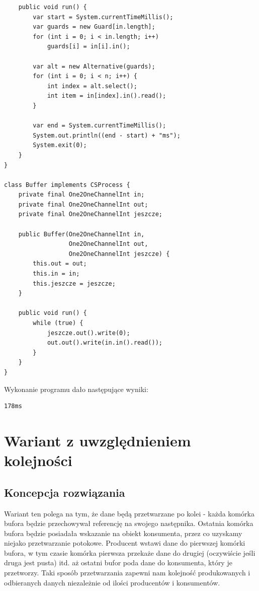 \documentclass[12pt]{article}
\begin{document}
\begin{verbatim}
    public void run() {
        var start = System.currentTimeMillis();
        var guards = new Guard[in.length];
        for (int i = 0; i < in.length; i++)
            guards[i] = in[i].in();

        var alt = new Alternative(guards);
        for (int i = 0; i < n; i++) {
            int index = alt.select();
            int item = in[index].in().read();
        }

        var end = System.currentTimeMillis();
        System.out.println((end - start) + "ms");
        System.exit(0);
    }
}

class Buffer implements CSProcess {
    private final One2OneChannelInt in;
    private final One2OneChannelInt out;
    private final One2OneChannelInt jeszcze;

    public Buffer(One2OneChannelInt in,
                  One2OneChannelInt out,
                  One2OneChannelInt jeszcze) {
        this.out = out;
        this.in = in;
        this.jeszcze = jeszcze;
    }

    public void run() {
        while (true) {
            jeszcze.out().write(0);
            out.out().write(in.in().read());
        }
    }
}
\end{verbatim}
\noindent
Wykonanie programu dało następujące wyniki:
\begin{verbatim}
178ms
\end{verbatim}

\section{Wariant z uwzględnieniem kolejności}
\subsection{Koncepcja rozwiązania}
Wariant ten polega na tym, że dane będą przetwarzane po kolei - każda komórka bufora będzie przechowywał referencję na swojego następnika. Ostatnia komórka bufora będzie posiadała wskazanie na obiekt konsumenta, przez co uzyskamy niejako przetwarzanie potokowe. Producent wstawi dane do pierwszej komórki bufora, w tym czasie komórka pierwsza przekaże dane do drugiej (oczywiście jeśli druga jest pusta) itd. aż ostatni bufor poda dane do konsumenta, który je przetworzy. Taki sposób przetwarzania zapewni nam kolejność produkowanych i odbieranych danych niezależnie od ilości producentów i konsumentów.
\end{document}
